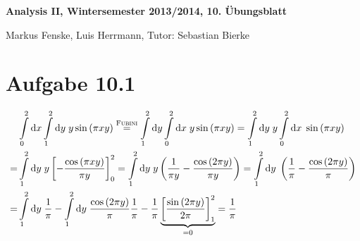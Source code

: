 \documentclass[a4paper,german,12pt,smallheadings]{scrartcl}
\begin{document}
\begin{center}
\bfseries %
\sffamily %
\vspace{-40pt}
Analysis II, Wintersemester 2013/2014, 10. Übungsblatt

Markus Fenske, Luis Herrmann, Tutor: Sebastian Bierke
\vspace{-10pt}
\end{center}
\allowdisplaybreaks %
\section*{Aufgabe 10.1}
\begin{align*}
  & \int\limits_0^2 \dif x \int\limits_1^2 \dif y \; y \sin\del{\pi x y} \overset{\text{\textsc{Fubini}}}{=}
    \int\limits_1^2 \dif y \int\limits_0^2 \dif x \; y \sin\del{\pi x y} =
    \int\limits_1^2 \dif y \; y \int\limits_0^2 \dif x \; \sin\del{\pi x y} \\ =
  & \int\limits_1^2 \dif y \; y \sbr{- \frac{\cos\del{\pi x y}}{\pi y}}_0^2 =
    \int\limits_1^2 \dif y \; y \del{\frac{1}{\pi y} - \frac{\cos\del{2 \pi y}}{\pi y}} =
    \int\limits_1^2 \dif y \; \del{\frac{1}{\pi} - \frac{\cos\del{2 \pi y}}{\pi}} \\ =
  & \int\limits_1^2 \dif y \; \frac{1}{\pi} - \int\limits_1^2 \dif y \; \frac{\cos\del{2 \pi y}}{\pi}
    \frac{1}{\pi} - \frac{1}{\pi} \underbrace{\sbr{\frac{\sin\del{2 \pi y}}{2 \pi}}_1^2}_{=0} = \frac{1}{\pi}
\end{align*}
\end{document}
